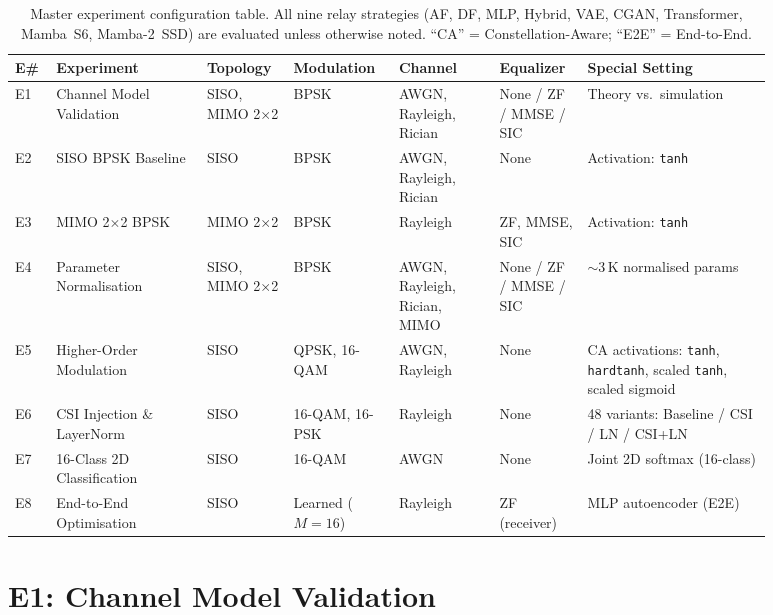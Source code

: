\begin{table}[H]
\centering
\caption{Master experiment configuration table. All nine relay strategies
(AF, DF, MLP, Hybrid, VAE, CGAN, Transformer, Mamba~S6, Mamba-2~SSD) are evaluated
unless otherwise noted. ``CA'' = Constellation-Aware; ``E2E'' = End-to-End.}
\label{tbl:master-config}
\small
\begin{tabular}{@{}p{0.04\linewidth}p{0.18\linewidth}p{0.10\linewidth}p{0.12\linewidth}p{0.12\linewidth}p{0.10\linewidth}p{0.22\linewidth}@{}}
\toprule
\textbf{E\#} & \textbf{Experiment} & \textbf{Topology} & \textbf{Modulation} & \textbf{Channel} & \textbf{Equalizer} & \textbf{Special Setting} \\
\midrule
E1 & Channel Model Validation & SISO, MIMO 2$\times$2 & BPSK & AWGN, Rayleigh, Rician & None / ZF / MMSE / SIC & Theory vs.\ simulation \\
\midrule
E2 & SISO BPSK Baseline & SISO & BPSK & AWGN, Rayleigh, Rician & None & Activation: \texttt{tanh} \\
\midrule
E3 & MIMO 2$\times$2 BPSK & MIMO 2$\times$2 & BPSK & Rayleigh & ZF, MMSE, SIC & Activation: \texttt{tanh} \\
\midrule
E4 & Parameter Normalisation & SISO, MIMO 2$\times$2 & BPSK & AWGN, Rayleigh, Rician, MIMO & None / ZF / MMSE / SIC & $\sim$3\,K normalised params \\
\midrule
E5 & Higher-Order Modulation & SISO & QPSK, 16-QAM & AWGN, Rayleigh & None & CA activations: \texttt{tanh}, \texttt{hardtanh}, scaled \texttt{tanh}, scaled sigmoid \\
\midrule
E6 & CSI Injection \& LayerNorm & SISO & 16-QAM, 16-PSK & Rayleigh & None & 48 variants: Baseline / CSI / LN / CSI+LN \\
\midrule
E7 & 16-Class 2D Classification & SISO & 16-QAM & AWGN & None & Joint 2D softmax (16-class) \\
\midrule
E8 & End-to-End Optimisation & SISO & Learned ($M{=}16$) & Rayleigh & ZF (receiver) & MLP autoencoder (E2E) \\
\bottomrule
\end{tabular}
\end{table}

\section{E1: Channel Model Validation}\label{sec:channel-model-validation}

